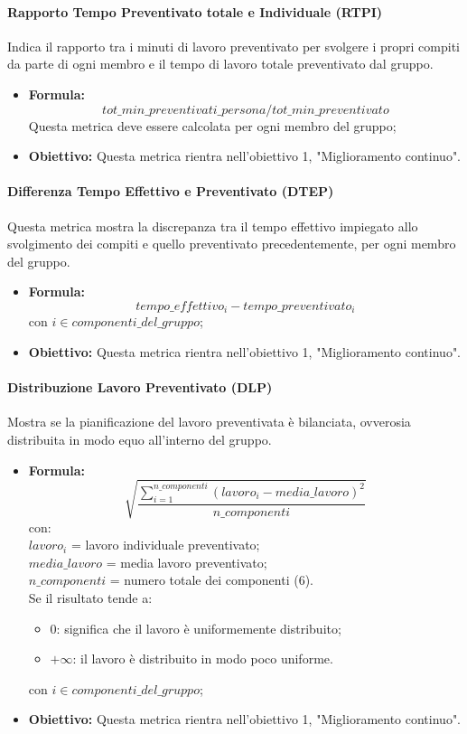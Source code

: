 	\paragraph{Rapporto Tempo Preventivato totale e Individuale (RTPI)}
	Indica il rapporto tra i minuti di lavoro preventivato per svolgere i propri compiti da parte di ogni membro e il tempo di lavoro totale preventivato dal gruppo.
	
	\begin{itemize}
		\item \textbf{Formula:}\[tot\_min\_preventivati\_persona / tot\_min\_preventivato\]
		Questa metrica deve essere calcolata per ogni membro del gruppo;
		\item \textbf{Obiettivo:} Questa metrica rientra nell'obiettivo 1, "Miglioramento continuo".
	\end{itemize}
	
	\paragraph{Differenza Tempo Effettivo e Preventivato (DTEP)}
	Questa metrica mostra la discrepanza tra il tempo effettivo impiegato allo svolgimento dei compiti e quello preventivato precedentemente, per ogni membro del gruppo.
	\begin{itemize}
		\item \textbf{Formula:}\[tempo\_effettivo_i - tempo\_preventivato_i\]
		con $i \in {componenti\_del\_gruppo}$;
		\item \textbf{Obiettivo:} Questa metrica rientra nell'obiettivo 1, "Miglioramento continuo".
	\end{itemize}
	
	\paragraph{Distribuzione Lavoro Preventivato (DLP)}
	Mostra se la pianificazione del lavoro preventivata è bilanciata, ovverosia distribuita in modo equo all'interno del gruppo.
	\begin{itemize}
		\item \textbf{Formula:}\[\sqrt{\frac{\sum_{i=1}^{n\_componenti}(lavoro_i-media\_lavoro)^2}{n\_componenti}}\]
		con:\\
		$lavoro_i$ = lavoro individuale preventivato;\\
		$media\_lavoro$ = media lavoro preventivato;\\
		$n\_componenti$ = numero totale dei componenti (6).
		\\Se il risultato tende a:
		\begin{itemize}
			\item 0: significa che il lavoro è uniformemente distribuito;
			\item $+\infty$: il lavoro è distribuito in modo poco uniforme.
		\end{itemize}
		con $i \in {componenti\_del\_gruppo}$;
		\item \textbf{Obiettivo:} Questa metrica rientra nell'obiettivo 1, "Miglioramento continuo".
	\end{itemize}
	

